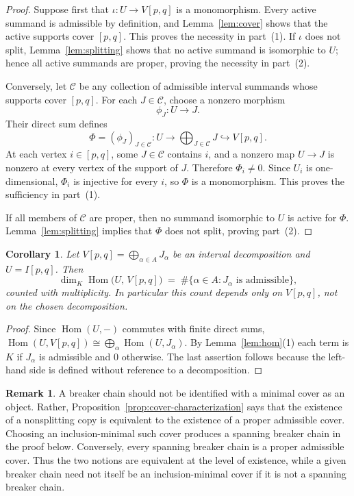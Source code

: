 \documentclass[11pt]{amsart}
\numberwithin{equation}{section}
\newtheorem{corollary}[theorem]{Corollary}
\theoremstyle{definition}
\newtheorem{remark}[theorem]{Remark}
\begin{document}
\begin{proof}
Suppose first that $\iota:U\to V[p,q]$ is a monomorphism.  Every active
summand is admissible by definition, and Lemma~\ref{lem:cover} shows that the
active supports cover $[p,q]$.  This proves the necessity in part~(1).  If
$\iota$ does not split, Lemma~\ref{lem:splitting} shows that no active
summand is isomorphic to $U$; hence all active summands are proper, proving
the necessity in part~(2).

Conversely, let $\mathcal C$ be any collection of admissible interval
summands whose supports cover $[p,q]$.  For each $J\in\mathcal C$, choose a
nonzero morphism
\[
\phi_J:U\longrightarrow J.
\]
Their direct sum defines
\[
\Phi=(\phi_J)_{J\in\mathcal C}:
U\longrightarrow\bigoplus_{J\in\mathcal C}J
\hookrightarrow V[p,q].
\]
At each vertex $i\in[p,q]$, some $J\in\mathcal C$ contains $i$, and a
nonzero map $U\to J$ is nonzero at every vertex of the support of $J$.
Therefore $\Phi_i\ne0$.  Since $U_i$ is one-dimensional, $\Phi_i$ is
injective for every $i$, so $\Phi$ is a monomorphism.  This proves the
sufficiency in part~(1).

If all members of $\mathcal C$ are proper, then no summand isomorphic to
$U$ is active for $\Phi$.  Lemma~\ref{lem:splitting} implies that $\Phi$
does not split, proving part~(2).
\end{proof}
\begin{corollary}\label{cor:homcount}
Let $V[p,q]=\bigoplus_{\alpha\in A}J_\alpha$ be an interval decomposition and
$U=I[p,q]$. Then
\[
  \dim_K \operatorname{Hom}\bigl(U,\,V[p,q]\bigr)
  \;=\; \#\{\alpha\in A : J_\alpha \text{ is admissible}\},
\]
counted with multiplicity. In particular this count depends only on $V[p,q]$,
not on the chosen decomposition.
\end{corollary}

\begin{proof}
Since $\operatorname{Hom}(U,-)$ commutes with finite direct sums,
$\operatorname{Hom}(U,V[p,q])\cong\bigoplus_{\alpha}\operatorname{Hom}(U,J_\alpha)$.
By Lemma~\ref{lem:hom}(1) each term is $K$ if $J_\alpha$ is admissible and $0$
otherwise. The last assertion follows because the left-hand side is defined
without reference to a decomposition.
\end{proof}
\begin{remark}\label{rem:minimal-cover-chain}
A breaker chain should not be identified with a minimal cover as an object.
Rather, Proposition~\ref{prop:cover-characterization} says that the existence
of a nonsplitting copy is equivalent to the existence of a proper admissible
cover.  Choosing an inclusion-minimal such cover produces a spanning breaker
chain in the proof below.  Conversely, every spanning breaker chain is a
proper admissible cover.  Thus the two notions are equivalent at the level of
existence, while a given breaker chain need not itself be an inclusion-minimal
cover if it is not a spanning breaker chain.
\end{remark}
\end{document}
